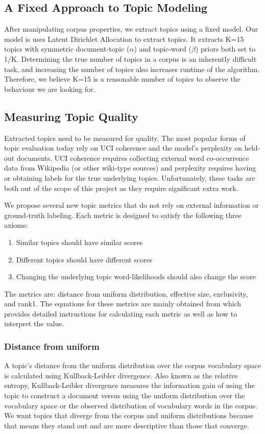 \documentclass[letterpaper, 10 pt, conference]{ieeeconf}  %
\begin{document}
\subsection{A Fixed Approach to Topic Modeling}

After manipulating corpus properties, we extract topics using a fixed model. Our model is uses Latent Dirichlet Allocation to extract topics. It extracts K=15 topics with symmetric document-topic ($\alpha$) and topic-word ($\beta$) priors both set to 1/K. Determining the true number of topics in a corpus is an inherently difficult task, and increasing the number of topics also increases runtime of the algorithm. Therefore, we believe K=15 is a reasonable number of topics to observe the behaviour we are looking for.

\subsection{Measuring Topic Quality}

Extracted topics need to be measured for quality. The most popular forms of topic evaluation today rely on UCI coherence and the model’s perplexity on held-out documents. UCI coherence requires collecting external word co-occurrence data from Wikipedia (or other wiki-type sources) and perplexity requires having or obtaining labels for the true underlying topics. Unfortunately, these tasks are both out of the scope of this project as they require significant extra work.

We propose several new topic metrics that do not rely on external information or ground-truth labeling. Each metric is designed to satisfy the following three axioms:
\begin{enumerate}
\item Similar topics should have similar scores
\item Different topics should have different scores
\item Changing the underlying topic word-likelihoods should also change the score
\end{enumerate}

The metrics are: distance from uniform distribution, effective size, exclusivity, and rank1. The equations for these metrics are mainly obtained from \cite{mallet2002} which provides detailed instructions for calculating each metric as well as how to interpret the value.

\subsubsection{Distance from uniform} A topic's distance from the uniform distribution over the corpus vocabulary space is calculated using Kullback-Leibler divergence. Also known as the relative entropy, Kullback-Leibler divergence measures the information gain of using the topic to construct a document versus using the uniform distribution over the vocabulary space or the observed distribution of vocabulary words in the corpus. We want topics that diverge from the corpus and uniform distributions because that means they stand out and are more descriptive than those that converge.
\end{document}
